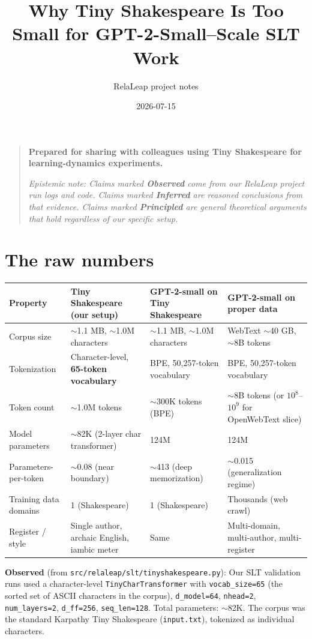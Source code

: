 \documentclass[11pt]{article}
\title{Why Tiny Shakespeare Is Too Small for GPT-2-Small--Scale SLT Work}
\author{RelaLeap project notes}
\date{2026-07-15}
\begin{document}
\maketitle

\begin{quote}
\textbf{Prepared for sharing with colleagues using Tiny Shakespeare for learning-dynamics experiments.}

\emph{Epistemic note: Claims marked \textbf{Observed} come from our RelaLeap project run logs and code. Claims marked \textbf{Inferred} are reasoned conclusions from that evidence. Claims marked \textbf{Principled} are general theoretical arguments that hold regardless of our specific setup.}
\end{quote}

\section{The raw numbers}

\begin{table}[h]
\centering
\begin{tabular}{p{}p{}p{}p{}}
\toprule
Property & Tiny Shakespeare (our setup) & GPT-2-small on Tiny Shakespeare & GPT-2-small on proper data \\
\midrule
Corpus size & $\sim$1.1 MB, $\sim$1.0M characters & $\sim$1.1 MB, $\sim$1.0M characters & WebText $\sim$40 GB, $\sim$8B tokens \\
Tokenization & Character-level, \textbf{65-token vocabulary} & BPE, 50,257-token vocabulary & BPE, 50,257-token vocabulary \\
Token count & $\sim$1.0M tokens & $\sim$300K tokens (BPE) & $\sim$8B tokens (or $10^8$--$10^9$ for OpenWebText slice) \\
Model parameters & $\sim$82K (2-layer char transformer) & 124M & 124M \\
Parameters-per-token & $\sim$0.08 (near boundary) & $\sim$413 (deep memorization) & $\sim$0.015 (generalization regime) \\
Training data domains & 1 (Shakespeare) & 1 (Shakespeare) & Thousands (web crawl) \\
Register / style & Single author, archaic English, iambic meter & Same & Multi-domain, multi-author, multi-register \\
\bottomrule
\end{tabular}
\end{table}

\textbf{Observed} (from \texttt{src/relaleap/slt/tinyshakespeare.py}): Our SLT validation runs used a character-level \texttt{TinyCharTransformer} with \texttt{vocab\_size=65} (the sorted set of ASCII characters in the corpus), \texttt{d\_model=64}, \texttt{nhead=2}, \texttt{num\_layers=2}, \texttt{d\_ff=256}, \texttt{seq\_len=128}. Total parameters: $\sim$82K. The corpus was the standard Karpathy Tiny Shakespeare (\texttt{input.txt}), tokenized as individual characters.
\end{document}
